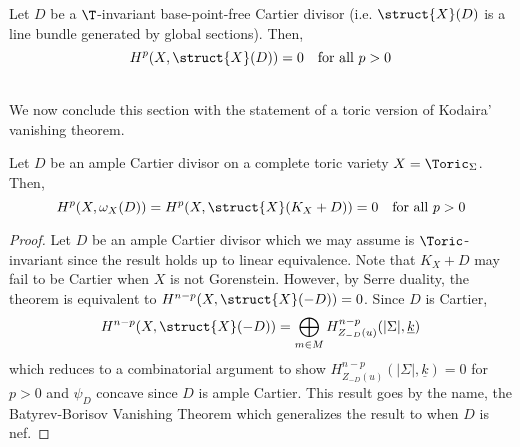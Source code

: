 \begin{theorem}
Let $D$ be a $\T$-invariant base-point-free Cartier divisor (i.e. $\struct{X}(D)$ is a line bundle generated by global sections). Then,
\[ H^p(X, \struct{X}(D)) = 0 \quad \text{for all } p > 0 \]
\end{theorem}
\noindent\\
We now conclude this section with the statement of a toric version of Kodaira' vanishing theorem.

\begin{theorem}
Let $D$ be an ample Cartier divisor on a complete toric variety $X = \Toric_\Sigma$. Then,
\[ H^p(X, \omega_X(D)) = H^p(X, \struct{X}(K_X + D)) = 0 \quad \text{for all } p > 0 \]
\end{theorem}

\begin{proof}
Let $D$ be an ample Cartier divisor which we may assume is $\Toric$-invariant since the result holds up to linear equivalence. Note that $K_X + D$ may fail to be Cartier when $X$ is not Gorenstein. However, by Serre duality, the theorem is equivalent to $H^{n-p}(X, \struct{X}(-D)) = 0$. Since $D$ is Cartier,
\[ H^{n-p}(X, \struct{X}(-D)) = \bigoplus_{m \in M} H^{n-p}_{Z_{-D}(u)}(|\Sigma|, \underline{k}) \]
which reduces to a combinatorial argument to show $H^{n-p}_{Z_{-D}(u)}(|\Sigma|, \underline{k}) = 0$ for $p > 0$ and $\psi_D$ concave since $D$ is ample Cartier. This result goes by the name, the Batyrev-Borisov Vanishing Theorem \cite[Thm. 92.7]{cox} which generalizes the result to when $D$ is nef. 
\end{proof}

